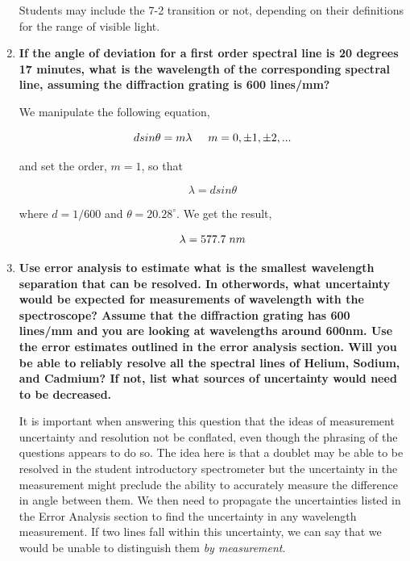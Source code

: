 \documentclass[justified]{tufte-book}
\begin{document}
\begin{enumerate}
\noindent Students may include the 7-2 transition or not, depending on their definitions for the range of visible light.

\item {\bf If the angle of deviation for a first order spectral line is 20 degrees 17 minutes, what is the wavelength of the corresponding spectral line, assuming the diffraction grating is 600 lines/mm?}\newline

We manipulate the following equation,

\begin{equation}
dsin\theta=m\lambda\hspace{5mm}m=0,\pm1,\pm2,...
\label{equ:spcg3}
\end{equation}

\noindent and set the order, $m=1$, so that

\begin{equation}
\lambda=dsin\theta
\label{equ:spcg4}
\end{equation}

\noindent where $d=1/600$ and $\theta=20.28^{\circ}$. We get the result,

\begin{equation}
\lambda=577.7\hspace{1mm}nm
\label{equ:spcg5}
\end{equation}

\item {\bf Use error analysis to estimate what is the smallest wavelength separation that can be resolved. In otherwords, what uncertainty would be expected for measurements of wavelength with the spectroscope? Assume that the diffraction grating has 600 lines/mm and you are looking at wavelengths around 600nm. Use the error estimates outlined in the error analysis section. Will you be able to reliably resolve all the spectral lines of Helium, Sodium, and Cadmium? If not, list what sources of uncertainty would need to be decreased.}\newline

It is important when answering this question that the ideas of measurement uncertainty and resolution not be conflated, even though the phrasing of the questions appears to do so. The idea here is that a doublet may be able to be resolved in the student introductory spectrometer but the uncertainty in the measurement might preclude the ability to accurately measure the difference in angle between them. We then need to propagate the uncertainties listed in the Error Analysis section to find the uncertainty in any wavelength measurement. If two lines fall within this uncertainty, we can say that we would be unable to distinguish them {\it by measurement}. 


\end{enumerate}
\end{document}
